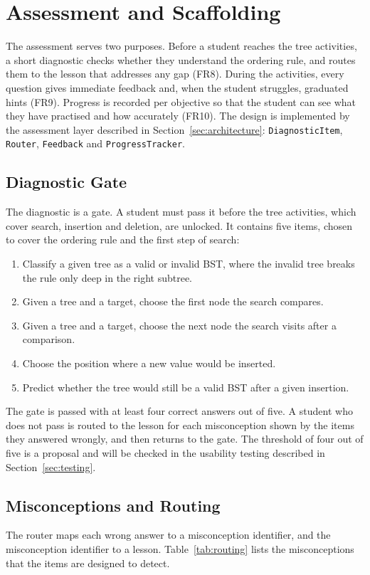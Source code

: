 \section{Assessment and Scaffolding}\label{sec:assessment}


The assessment serves two purposes. Before a student reaches the tree activities, a short diagnostic checks whether they understand the ordering rule, and routes them to the lesson that addresses any gap (FR8). During the activities, every question gives immediate feedback and, when the student struggles, graduated hints (FR9). Progress is recorded per objective so that the student can see what they have practised and how accurately (FR10). The design is implemented by the assessment layer described in Section~\ref{sec:architecture}: \texttt{DiagnosticItem}, \texttt{Router}, \texttt{Feedback} and \texttt{ProgressTracker}.

\subsection{Diagnostic Gate}
The diagnostic is a gate. A student must pass it before the tree activities, which cover search, insertion and deletion, are unlocked. It contains five items, chosen to cover the ordering rule and the first step of search:
\begin{enumerate}
    \item Classify a given tree as a valid or invalid BST, where the invalid tree breaks the rule only deep in the right subtree.
    \item Given a tree and a target, choose the first node the search compares.
    \item Given a tree and a target, choose the next node the search visits after a comparison.
    \item Choose the position where a new value would be inserted.
    \item Predict whether the tree would still be a valid BST after a given insertion.
\end{enumerate}
The gate is passed with at least four correct answers out of five. A student who does not pass is routed to the lesson for each misconception shown by the items they answered wrongly, and then returns to the gate. The threshold of four out of five is a proposal and will be checked in the usability testing described in Section~\ref{sec:testing}.

\subsection{Misconceptions and Routing}
The router maps each wrong answer to a misconception identifier, and the misconception identifier to a lesson. Table~\ref{tab:routing} lists the misconceptions that the items are designed to detect.


